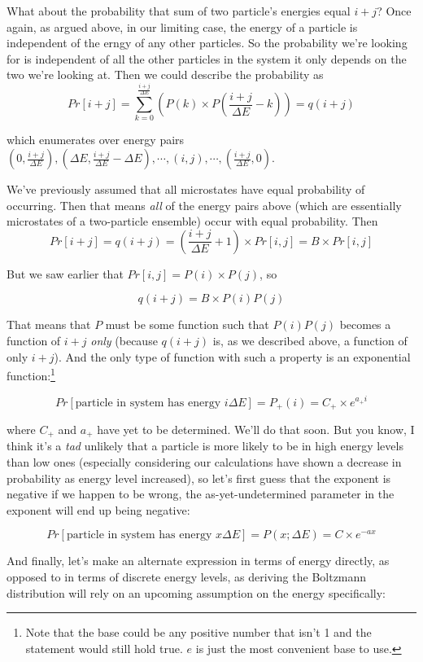 \documentclass[letterpaper,12pt]{report}
\begin{document}
What about the probability that sum of two particle's energies equal \(i+j\)?
Once again, as argued above, in our limiting case, the energy of a particle is independent
of the erngy of any other particles. So the probability we're looking for is independent
of all the other particles in the system \textemdash{} it only depends on the two we're looking
at. Then we could describe the probability as
\[Pr[i+j] = 
  \sum_{k=0}^{\frac{i+j}{\Delta E}}\left(P(k)
  \times P\left(\frac{i+j}{\Delta E} - k\right)\right)
  = q(i+j) 
  \]

which enumerates over energy pairs
\( (0,\frac{i+j}{\Delta E}), (\Delta E,\frac{i+j}{\Delta E} - \Delta E), \cdots,
  (i, j), \cdots, (\frac{i+j}{\Delta E}, 0) \).


We've previously assumed that all microstates have equal probability of occurring.
Then that means \emph{all} of the energy pairs above (which are essentially microstates of a
two-particle ensemble) occur with equal probability.
Then
\[Pr[i+j] = q(i+j) = \left(\frac{i+j}{\Delta E} + 1\right) \times Pr[i,j] = B \times Pr[i,j]\]

But we saw earlier that \(Pr[i,j] = P(i) \times P(j)\), so

\[q(i+j) = B \times P(i)P(j)\]

That means that 
\(P\) must be some function such that \(P(i)P(j)\) becomes a function of \(i+j\) \emph{only} (because \(q(i+j)\) is, as we described above, a function of only \(i+j\)).
And the only type of function with such a property is an exponential function:\footnote{
  Note that the base could be any positive number that isn't 1 and the statement would still
  hold true. \(e\) is just the most convenient base to use.
}

\[Pr[\text{particle in system has energy }i\Delta E] 
              = P_{+}(i) = C_{+}\times e^{a_{+}i}
\]

where \(C_{+}\) and \(a_{+}\) have yet to be determined. We'll do that soon.
But you know,
I think it's a \emph{tad} unlikely that a particle is more likely to be in high
energy levels than low ones (especially considering our calculations have shown a decrease in
probability as energy level increased),
so let's first guess that the exponent is negative \textemdash{} if we happen to be wrong,
the as-yet-undetermined parameter in the exponent will end up being negative:

\[Pr[\text{particle in system has energy }x\Delta E] = P(x; \Delta E) = C\times e^{-ax} \]

And finally, let's make an alternate expression in terms of energy directly, as opposed to
in terms of discrete energy levels, as deriving the Boltzmann distribution will rely on
an upcoming assumption on the energy specifically:
\end{document}
